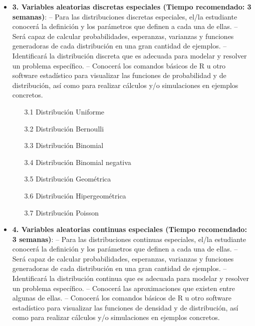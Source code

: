 \begin{itemize}
\begin{enumerate}
\item[2.6 ] \textbf{Funci\'on generadora de momentos}: -- Conocer\'a las propiedades de la Funci\'on Generadora de Momentos. -- Utilizar\'a la funci\'on generadora de momentos para determinar los momentos de una variable aleatoria.

\item[2.7 ]  \textbf{Funci\'on generadora de probabilidad}: -- Aplicar\'a el concepto de funci\'on generadora de probabilidad para describir distribuciones discretas y sus propiedades.
\end{enumerate}

\item \textbf{3. Variables aleatorias discretas especiales (Tiempo recomendado: 3 semanas)}:  -- Para las distribuciones discretas especiales, el/la estudiante conocer\'a la definici\'on y los par\'ametros que definen a cada una de ellas. -- Ser\'a capaz de calcular probabilidades, esperanzas, varianzas y funciones generadoras de cada distribuci\'on en una gran cantidad de ejemplos. -- Identificar\'a la distribuci\'on discreta que es adecuada para modelar y resolver un problema espec\'ifico. -- Conocer\'a los comandos b\'asicos de R u otro software estad\'istico para visualizar las funciones de probabilidad y de distribuci\'on, as\'i como para realizar c\'alculos y/o simulaciones en ejemplos concretos.


\begin{enumerate}
\item[3.1 ] Distribuci\'on Uniforme
\item[3.2 ] Distribuci\'on Bernoulli
\item[3.3 ] Distribuci\'on Binomial
\item[3.4 ] Distribuci\'on Binomial negativa
\item[3.5 ] Distribuci\'on Geom\'etrica
\item[3.6 ] Distribuci\'on Hipergeom\'etrica
\item[3.7 ] Distribuci\'on Poisson
\end{enumerate}

\item \textbf{4. Variables aleatorias continuas especiales (Tiempo recomendado: 3 semanas)}:  -- Para las distribuciones continuas especiales, el/la estudiante conocer\'a la definici\'on y los par\'ametros que definen a cada una de ellas. -- Ser\'a capaz de calcular probabilidades, esperanzas, varianzas y funciones generadoras de cada distribuci\'on en una gran cantidad de ejemplos.  -- Identificar\'a la distribuci\'on continua que es adecuada para modelar y resolver un problema espec\'ifico. -- Conocer\'a las aproximaciones que existen entre algunas de ellas. -- Conocer\'a los comandos b\'asicos de R u otro software estad\'istico para visualizar las funciones de densidad y de distribuci\'on, as\'i como para realizar c\'alculos y/o simulaciones en ejemplos concretos.



\end{itemize}
